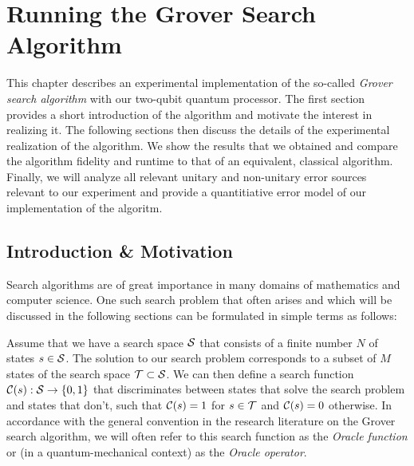 
\chapter{Running the Grover Search Algorithm} \label{chapter:grover_algorithm}

This chapter describes an experimental implementation of the so-called {\it Grover search algorithm} with our two-qubit quantum processor. The first section provides a short introduction of the algorithm and motivate the interest in realizing it. The following sections then discuss the details of the experimental realization of the algorithm. We show the results that we obtained and compare the algorithm fidelity and runtime to that of an equivalent, classical algorithm. Finally, we will analyze all relevant unitary and non-unitary error sources relevant to our experiment and provide a quantitiative error model of our implementation of the algoritm.

\section{Introduction \& Motivation}

Search algorithms are of great importance in many domains of mathematics and computer science. One such search problem that often arises and which will be discussed in the following sections can be formulated in simple terms as follows:

\smallskip

Assume that we have a search space $\begin{mathcal}S\end{mathcal}$ that consists of a finite number $N$ of states $s \in \begin{mathcal}S\end{mathcal}$. The solution to our search problem corresponds to a subset of $M$ states of the search space $\begin{mathcal}T\end{mathcal} \subset \begin{mathcal}S\end{mathcal}$. We can then define a search function $\Or(s):\begin{mathcal}S\end{mathcal}\to \{0,1\}$ that discriminates between states that solve the search problem and states that don't, such that $\Or(s) = 1$ for $s \in \begin{mathcal}T\end{mathcal}$ and $\Or(s) = 0$ otherwise. In accordance with the general convention in the research literature on the Grover search algorithm, we will  often refer to this search function as the {\it Oracle function} or (in a quantum-mechanical context) as the {\it Oracle operator}.

